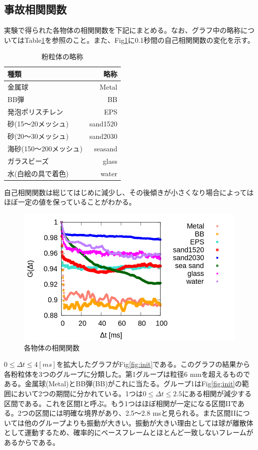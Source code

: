 \documentclass[a4paper,12pt,dvipdfmx]{jsarticle}
\newcommand{\Dt}{\Delta t}
\newcommand{\II}{I\hspace{-.1em}I}
\begin{document}
\subsection{事故相関関数}
実験で得られた各物体の相関関数を下記にまとめる。なお、グラフ中の略称についてはTable\ref{tb:ballname}を参照のこと。また、Fig\ref{fig:overall}に0.1秒間の自己相関関数の変化を示す。 \par
\begin{table}[H]
	\caption{粉粒体の略称 \label{tb:ballname}}
	\begin{tabular}{lr}
		\toprule
		種類 & 略称 \\
		\midrule
		金属球 & Metal \\
		BB弾 & BB \\
		発泡ポリスチレン & EPS \\
		砂(15〜20メッシュ) & sand1520 \\
		砂(20〜30メッシュ) & sand2030 \\
		海砂(150〜200メッシュ) & seasand \\
		ガラスビーズ & glass \\
		水(白絵の具で着色) & water \\
		\bottomrule
	\end{tabular}
\end{table}
自己相関関数は総じてはじめに減少し、その後傾きが小さくなり場合によってはほぼ一定の値を保っていることがわかる。 \par
\begin{figure}[H]
	\includegraphics[scale=0.4]{multi.png}
	\caption{各物体の相関関数}
	\label{fig:overall}
\end{figure}
$0 \leq \Delta t \leq 4 [ms]$を拡大したグラフがFig\ref{fig:init}である。このグラフの結果から各粉粒体を3つのグループに分類した。第1グループは粒径6 mmを超えるものである。金属球(Metal)とBB弾(BB)がこれに当たる。グループ1はFig\ref{fig:init}の範囲において2つの期間に分かれている。1つは$0 \leq \Dt \leq 2.5$にある相関が減少する区間である。これを区間Iと呼ぶ。もう1つはほぼ相関が一定になる区間\II である。2つの区間には明確な境界があり、2.5〜2.8 msと見られる。また区間\II については他のグループよりも振動が大きい。振動が大きい理由としては球が離散体として運動するため、確率的にベースフレームとほとんど一致しないフレームがあるからである。 \par
\end{document}
